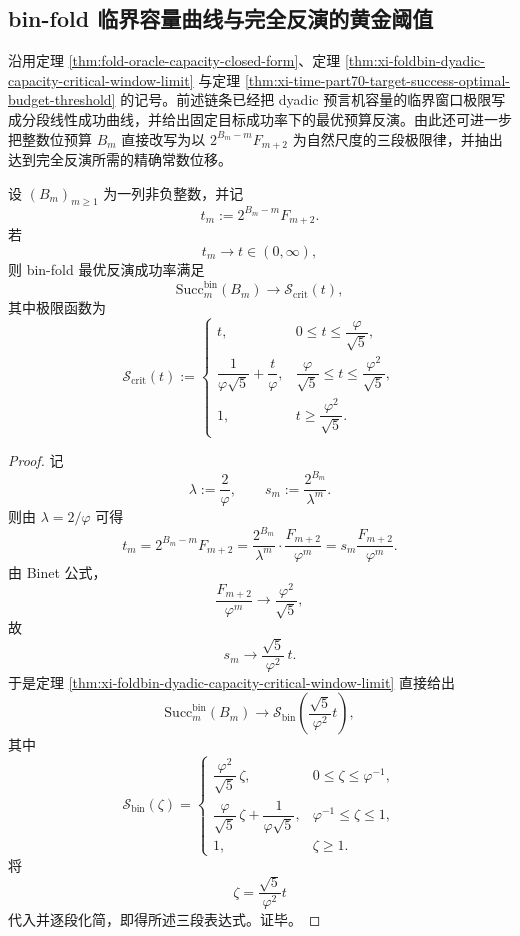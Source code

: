 \subsection{bin-fold 临界容量曲线与完全反演的黄金阈值}\label{subsec:conclusion-binfold-critical-capacity-golden-threshold}
沿用定理 \ref{thm:fold-oracle-capacity-closed-form}、定理 \ref{thm:xi-foldbin-dyadic-capacity-critical-window-limit} 与定理 \ref{thm:xi-time-part70-target-success-optimal-budget-threshold} 的记号。前述链条已经把 dyadic 预言机容量的临界窗口极限写成分段线性成功曲线，并给出固定目标成功率下的最优预算反演。由此还可进一步把整数位预算 \(B_m\) 直接改写为以 \(2^{B_m-m}F_{m+2}\) 为自然尺度的三段极限律，并抽出达到完全反演所需的精确常数位移。

\begin{theorem}\label{thm:conclusion-binfold-critical-capacity-threephase-law}
设 \((B_m)_{m\ge 1}\) 为一列非负整数，并记
\[
t_m:=2^{B_m-m}F_{m+2}.
\]
若
\[
t_m\longrightarrow t\in(0,\infty),
\]
则 bin-fold 最优反演成功率满足
\[
\mathrm{Succ}_m^{\mathrm{bin}}(B_m)\longrightarrow \mathcal S_{\mathrm{crit}}(t),
\]
其中极限函数为
\[
\mathcal S_{\mathrm{crit}}(t):=
\begin{cases}
t, & 0\le t\le \dfrac{\varphi}{\sqrt5},\\[6pt]
\dfrac{1}{\varphi\sqrt5}+\dfrac{t}{\varphi},
& \dfrac{\varphi}{\sqrt5}\le t\le \dfrac{\varphi^2}{\sqrt5},\\[8pt]
1, & t\ge \dfrac{\varphi^2}{\sqrt5}.
\end{cases}
\]
\end{theorem}
\begin{proof}
记
\[
\lambda:=\frac{2}{\varphi},
\qquad
s_m:=\frac{2^{B_m}}{\lambda^m}.
\]
则由 \(\lambda=2/\varphi\) 可得
\[
t_m
=
2^{B_m-m}F_{m+2}
=
\frac{2^{B_m}}{\lambda^m}\cdot \frac{F_{m+2}}{\varphi^m}
=
s_m\frac{F_{m+2}}{\varphi^m}.
\]
由 Binet 公式，
\[
\frac{F_{m+2}}{\varphi^m}\longrightarrow \frac{\varphi^2}{\sqrt5},
\]
故
\[
s_m\longrightarrow \frac{\sqrt5}{\varphi^2}\,t.
\]
于是定理 \ref{thm:xi-foldbin-dyadic-capacity-critical-window-limit} 直接给出
\[
\mathrm{Succ}_m^{\mathrm{bin}}(B_m)\longrightarrow
\mathcal S_{\mathrm{bin}}\!\left(\frac{\sqrt5}{\varphi^2}t\right),
\]
其中
\[
\mathcal S_{\mathrm{bin}}(\zeta)=
\begin{cases}
\dfrac{\varphi^2}{\sqrt5}\,\zeta, & 0\le \zeta\le \varphi^{-1},\\[6pt]
\dfrac{\varphi}{\sqrt5}\,\zeta+\dfrac{1}{\varphi\sqrt5},
& \varphi^{-1}\le \zeta\le 1,\\[8pt]
1, & \zeta\ge 1.
\end{cases}
\]
将
\[
\zeta=\frac{\sqrt5}{\varphi^2}t
\]
代入并逐段化简，即得所述三段表达式。证毕。
\end{proof}

